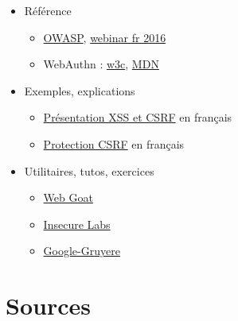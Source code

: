 \begin{itemize}
\tightlist
\item
  Référence

  \begin{itemize}
  \tightlist
  \item
    \href{https://www.owasp.org/index.php/Main_Page}{OWASP},
    \href{https://www.youtube.com/watch?v=pHI2zitLph8}{webinar fr 2016}
  \item
    WebAuthn : \href{https://www.w3.org/TR/webauthn/}{w3c},
    \href{https://developer.mozilla.org/en-US/docs/Web/API/Web_Authentication_API}{MDN}
  \end{itemize}
\item
  Exemples, explications

  \begin{itemize}
  \tightlist
  \item
    \href{http://www.journaldunet.com/developpeur/tutoriel/php/031030php_nexen-xss1.shtml}{Présentation
    XSS et CSRF} en français
  \item
    \href{http://www.apprendre-php.com/tutoriels/tutoriel-39-introduction-aux-cross-site-request-forgeries-ou-sea-surf.html}{Protection
    CSRF} en français
  \end{itemize}
\item
  Utilitaires, tutos, exercices

  \begin{itemize}
  \tightlist
  \item
    \href{https://www.owasp.org/index.php/Webgoat}{Web Goat}
  \item
    \href{http://www.insecurelabs.org/task}{Insecure Labs}
  \item
    \href{http://google-gruyere.appspot.com/}{Google-Gruyere}
  \end{itemize}
\end{itemize}

\hypertarget{sources}{%
\section{Sources}\label{sources}}
